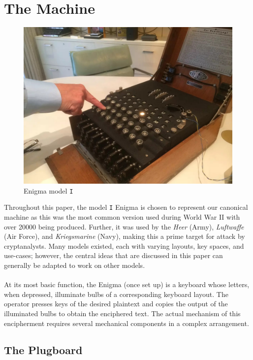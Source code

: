 \section{The Machine}
\begin{figure}[H]
  \begin{center}\includegraphics[scale=0.3]{paper/images/enigma.jpg}
  \end{center}
  \label{ref:enigma}
  \caption{Enigma model \texttt{I}}
\end{figure}
Throughout this paper, the model \texttt{I} Enigma is chosen to
represent our canonical machine as this was the most common version
used during World War II with over 20000 being produced. Further, it
was used by the \emph{Heer} (Army), \emph{Luftwaffe} (Air
Force), and \emph{Kriegsmarine} (Navy), making this a prime target
for attack by cryptanalysts. Many models existed,
each with varying
layouts, key spaces, and use-cases; however, the central ideas that
are discussed in this paper can generally be adapted to work on other models.
\\\\At its most basic function, the Enigma (once set up) is a
keyboard whose letters, when depressed, illuminate bulbs of a
corresponding keyboard layout. The operator presses keys of the
desired plaintext and copies the output of the illuminated bulbs to
obtain the enciphered text. The actual mechanism of this encipherment
requires several mechanical components in a complex arrangement.

\subsection{The Plugboard}

